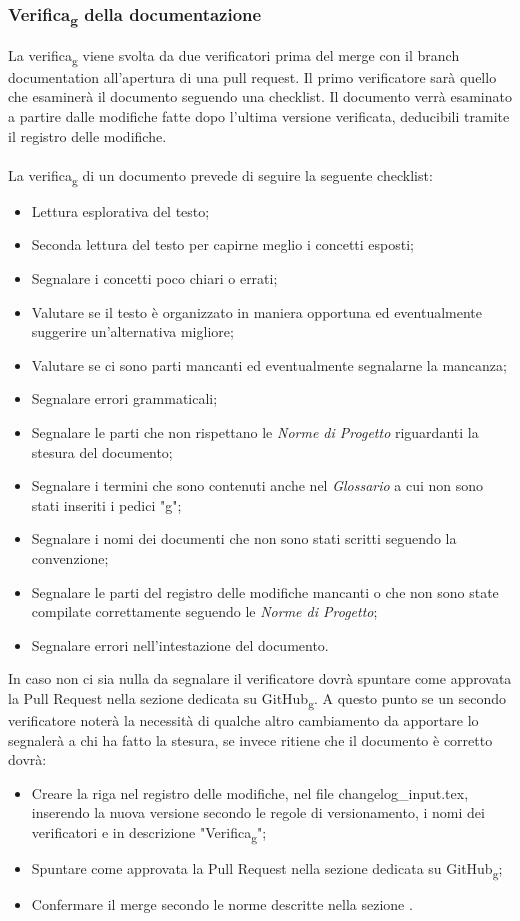 \subsubsection{Verifica\textsubscript{g} della documentazione}
\label{verifica_documentazione} 
La verifica\textsubscript{g} viene svolta da due verificatori prima del merge con il branch documentation all'apertura di una pull request.
Il primo verificatore sarà quello che esaminerà il documento seguendo una checklist. Il documento verrà esaminato a partire dalle modifiche fatte dopo l'ultima versione verificata, 
deducibili tramite il registro delle modifiche.
\\\\
La verifica\textsubscript{g} di un documento prevede di seguire la seguente checklist:
\begin{itemize}
    \item Lettura esplorativa del testo;
    \item Seconda lettura del testo per capirne meglio i concetti esposti;
    \item Segnalare i concetti poco chiari o errati;
    \item Valutare se il testo è organizzato in maniera opportuna ed eventualmente suggerire un'alternativa migliore;
    \item Valutare se ci sono parti mancanti ed eventualmente segnalarne la mancanza;
    \item Segnalare errori grammaticali;
    \item Segnalare le parti che non rispettano le \textit{Norme di Progetto} riguardanti la stesura del documento;
    \item Segnalare i termini che sono contenuti anche nel \textit{Glossario} a cui non sono stati inseriti i pedici "g";
    \item Segnalare i nomi dei documenti che non sono stati scritti seguendo la convenzione;
    \item Segnalare le parti del registro delle modifiche mancanti o che non sono state compilate correttamente seguendo le \textit{Norme di Progetto};
    \item Segnalare errori nell'intestazione del documento.
\end{itemize}
In caso non ci sia nulla da segnalare il verificatore dovrà spuntare come approvata la Pull Request nella sezione 
dedicata su GitHub\textsubscript{g}. 
A questo punto se un secondo verificatore noterà la necessità di qualche altro cambiamento da apportare lo segnalerà a 
chi ha fatto la stesura, se invece ritiene che il documento è corretto dovrà:
\begin{itemize}
    \item Creare la riga nel registro delle modifiche, nel file changelog\_input.tex, inserendo la nuova versione secondo le regole di versionamento, i nomi dei verificatori e in descrizione "Verifica\textsubscript{g}";
    \item Spuntare come approvata la Pull Request nella sezione dedicata su GitHub\textsubscript{g};
    \item Confermare il merge secondo le norme descritte nella sezione .
\end{itemize}